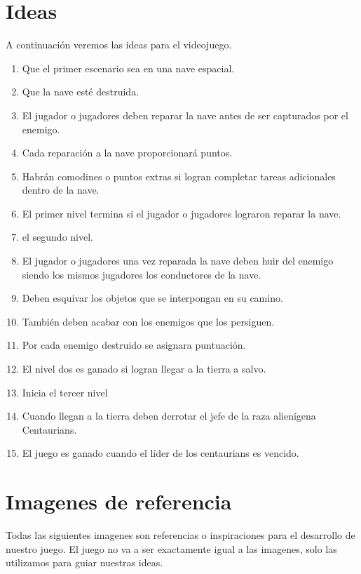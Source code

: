 \documentclass{article}
\begin{document}
\section{Ideas} \label{contenido}
A continuación veremos las ideas para el videojuego.
\begin{enumerate}
    \item Que el primer escenario sea en una nave espacial.
    \item Que la nave esté destruida.
    \item El jugador o jugadores deben reparar la nave antes de ser capturados por el enemigo.
    \item Cada reparación a la nave proporcionará puntos.
    \item Habrán comodines o puntos extras si logran completar tareas adicionales dentro de la nave.
    \item El primer nivel termina si el jugador o jugadores lograron reparar la nave.
    \item el segundo nivel.
    \item El jugador o jugadores una vez reparada la nave deben huir del enemigo siendo los mismos jugadores los conductores de la nave.
    \item Deben esquivar los objetos que se interpongan en su camino.
    \item También deben acabar con los enemigos que los persiguen.
    \item Por cada enemigo destruido se asignara puntuación.
    \item El nivel dos es ganado si logran llegar a la tierra a salvo.
    \item Inicia el tercer nivel
    \item Cuando llegan a la tierra deben derrotar el jefe de la raza alienígena Centaurians.
    \item El juego es ganado cuando el líder de los centaurians es vencido.
    
\end{enumerate}

\section{Imagenes de referencia} \label{imagenes}
Todas las siguientes imagenes son referencias o inspiraciones para el desarrollo de nuestro juego. El juego no va a ser exactamente igual a las imagenes, solo las utilizamos para guiar nuestras ideas.

\newpage
\end{document}
